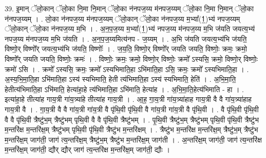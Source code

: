 \documentclass[17pt]{extarticle}
\begin{document}
39. इ॒मान् ॅलो॒कान् ॅलो॒का नि॒मा नि॒मान् ॅलो॒का न॑नपज॒य्य म॑नपज॒य्यम् ॅलो॒का नि॒मा नि॒मान् ॅलो॒का न॑नपज॒य्यम् । . लो॒का न॑नपज॒य्य म॑नपज॒य्यम् ॅलो॒कान् ॅलो॒का न॑नपज॒य्य म॒भ्या᳚(1॒)भ्य॑ नपज॒य्यम् ॅलो॒कान् ॅलो॒का न॑नपज॒य्य म॒भि । . अ॒न॒प॒ज॒य्य म॒भ्या᳚(1॒)भ्य॑ नपज॒य्य म॑नपज॒य्य म॒भि ज॑यति जयत्य॒भ्य॑ नपज॒य्य म॑नपज॒य्य म॒भि ज॑यति । . अ॒न॒प॒ज॒य्यमित्य॑नप - ज॒य्यम् । . अ॒भि ज॑यति जयत्य॒भ्य॑भि ज॑यति॒ विष्णो॒र् विष्णो᳚र् जयत्य॒भ्य॑भि ज॑यति॒ विष्णोः᳚ । . ज॒य॒ति॒ विष्णो॒र् विष्णो᳚र् जयति जयति॒ विष्णोः॒ क्रमः॒ क्रमो॒ विष्णो᳚र् जयति जयति॒ विष्णोः॒ क्रमः॑ । . विष्णोः॒ क्रमः॒ क्रमो॒ विष्णो॒र् विष्णोः॒ क्रमो᳚ ऽस्यसि॒ क्रमो॒ विष्णो॒र् विष्णोः॒ क्रमो॑ ऽसि । . क्रमो᳚ ऽस्यसि॒ क्रमः॒ क्रमो᳚ ऽस्यभिमाति॒हा ऽभि॑माति॒हा ऽसि॒ क्रमः॒ क्रमो᳚ ऽस्यभिमाति॒हा । . अ॒स्य॒भि॒मा॒ति॒हा ऽभि॑माति॒हा ऽस्य॑ स्यभिमाति॒ हेती त्य॑भिमाति॒हा ऽस्य॑ स्यभिमाति॒ हेति॑ । . अ॒भि॒मा॒ति॒ हेतीत्य॑भिमाति॒हा ऽभि॑माति॒ हेत्या॑हा॒हे त्य॑भिमाति॒हा ऽभि॑माति॒ हेत्या॑ह । . अ॒भि॒मा॒ति॒हेत्य॑भिमाति - हा । . इत्या॑हा॒हे तीत्या॑ह गाय॒त्री गा॑य॒त्र्या॑हे तीत्या॑ह गाय॒त्री । . आ॒ह॒ गा॒य॒त्री गा॑य॒त्र्या॑हाह गाय॒त्री वै वै गा॑य॒त्र्या॑हाह गाय॒त्री वै । . गा॒य॒त्री वै वै गा॑य॒त्री गा॑य॒त्री वै पृ॑थि॒वी पृ॑थि॒वी वै गा॑य॒त्री गा॑य॒त्री वै पृ॑थि॒वी । . वै पृ॑थि॒वी पृ॑थि॒वी वै वै पृ॑थि॒वी त्रैष्टु॑भ॒म् त्रैष्टु॑भम् पृथि॒वी वै वै पृ॑थि॒वी त्रैष्टु॑भम् । . पृ॒थि॒वी त्रैष्टु॑भ॒म् त्रैष्टु॑भम् पृथि॒वी पृ॑थि॒वी त्रैष्टु॑भ म॒न्तरि॑क्ष म॒न्तरि॑क्ष॒म् त्रैष्टु॑भम् पृथि॒वी पृ॑थि॒वी त्रैष्टु॑भ म॒न्तरि॑क्षम् । . त्रैष्टु॑भ म॒न्तरि॑क्ष म॒न्तरि॑क्ष॒म् त्रैष्टु॑भ॒म् त्रैष्टु॑भ म॒न्तरि॑क्ष॒म् जाग॑ती॒ जाग॑ त्य॒न्तरि॑क्ष॒म् त्रैष्टु॑भ॒म् त्रैष्टु॑भ म॒न्तरि॑क्ष॒म् जाग॑ती । . अ॒न्तरि॑क्ष॒म् जाग॑ती॒ जाग॑ त्य॒न्तरि॑क्ष म॒न्तरि॑क्ष॒म् जाग॑ती॒ द्यौर् द्यौर् जाग॑ त्य॒न्तरि॑क्ष म॒न्तरि॑क्ष॒म् जाग॑ती॒ द्यौः । \newline
\end{document}
